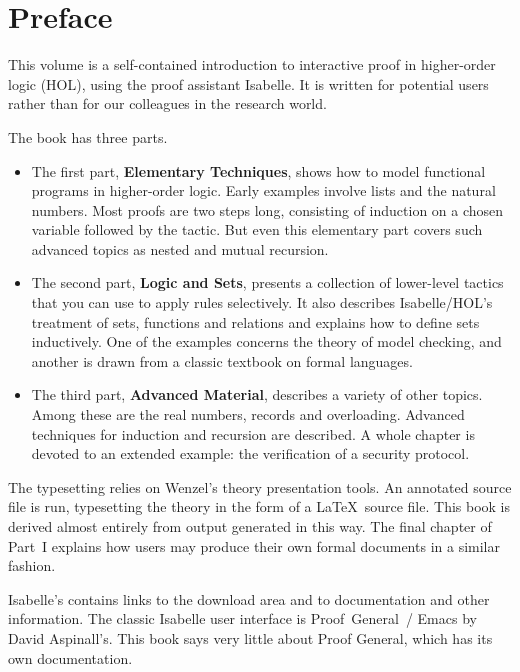 \chapter*{Preface}

This volume is a self-contained introduction to interactive proof
in higher-order logic (HOL), using the proof assistant Isabelle. 
It is written for potential users rather
than for our colleagues in the research world.

The book has three parts.  
\begin{itemize}
\item 
The first part, \textbf{Elementary Techniques},
shows how to model functional programs in higher-order logic.  Early
examples involve lists and the natural numbers.  Most proofs
are two steps long, consisting of induction on a chosen variable
followed by the  tactic.  But even this elementary part
covers such advanced topics as nested and mutual recursion.
\item 
The second part, \textbf{Logic and Sets}, presents a collection of
lower-level tactics that you can use to apply rules selectively.  It
also describes Isabelle/HOL's treatment of sets, functions and
relations and explains how to define sets inductively.  One of the
examples concerns the theory of model checking, and another is drawn
from a classic textbook on formal languages.
\item 
The third part, \textbf{Advanced Material}, describes a variety of other
topics.  Among these are the real numbers, records and overloading.  Advanced
techniques for induction and recursion are described.  A whole chapter is
devoted to an extended example: the verification of a security protocol.
\end{itemize}

The typesetting relies on Wenzel's theory presentation tools.  An
annotated source file is run, typesetting the theory
in the form of a \LaTeX\ source file.  This book is derived almost entirely
from output generated in this way.  The final chapter of Part~I explains how
users may produce their own formal documents in a similar fashion.

Isabelle's  contains
links to the download area and to documentation and other information.
The classic Isabelle user interface is Proof~General~/ Emacs by David
Aspinall's.  This book says very little about
Proof General, which has its own documentation.

